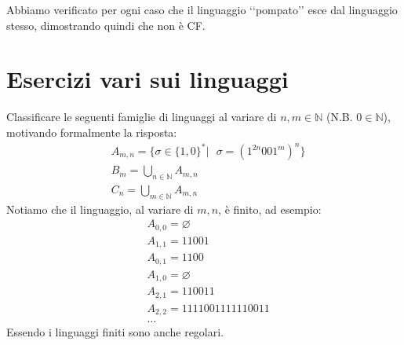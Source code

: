 \documentclass[a4paper,oneside]{scrbook}
\newcommand{\greenmark}{\quad \textcolor{green}{\checkmark}}
\begin{document}
Abbiamo verificato per ogni caso che il linguaggio ‘‘pompato’’ esce dal linguaggio stesso, dimostrando quindi che non è CF. \greenmark

\chapter{Esercizi vari sui linguaggi}
Classificare le seguenti famiglie di linguaggi al variare di $n,m \in \mathbb{N}$ (N.B. $0\in\mathbb{N}$), motivando formalmente la risposta:
\begin{align*}
	&A_{m,n}=\{ \sigma \in \{1,0\}^* | \text{ } \sigma = (1^{2n}001^m)^n \}\\
	&B_m = \bigcup_{n\in\mathbb{N}} A_{m,n}\\
	&C_n = \bigcup_{m\in\mathbb{N}} A_{m,n}
\end{align*}
Notiamo che il linguaggio, al variare di $m,n$, è finito, ad esempio:
\begin{align*}
	&A_{0,0}=\varnothing\\
	&A_{1,1}=11001\\
	&A_{0,1}=1100\\
	&A_{1,0}=\varnothing\\
	&A_{2,1}=110011\\
	&A_{2,2}=1111001111110011\\
	&\dots
\end{align*}
Essendo i linguaggi finiti sono anche regolari.
\end{document}
